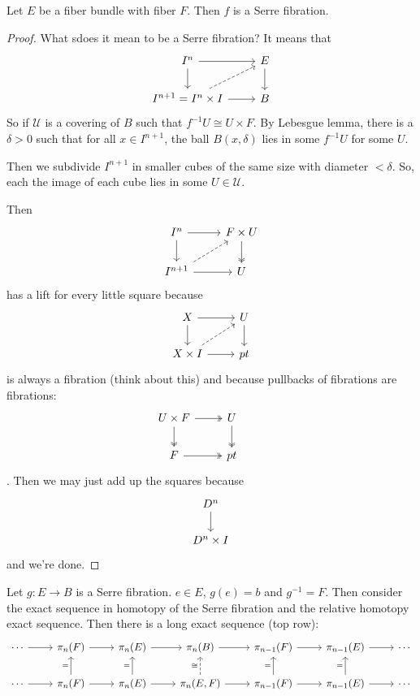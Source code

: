 \documentclass{article}
\newcommand{\Uc}{\mathcal{U}}
\begin{document}
\begin{prop}
	Let $E$ be a fiber bundle with fiber $F$. Then $f$ is a Serre fibration.
\end{prop}
\begin{proof}
	What sdoes it mean to be a Serre fibration? It means that
	\[\begin{tikzcd}
		I^n\arrow[r]\arrow[d]&E\arrow[d]\\
		I^{n+1}=I^n\times I\arrow[r]\arrow[ur,dashed]&B
	\end{tikzcd}\]
	So if $\Uc$ is a covering of $B$ such that $f^{-1}U\cong U\times F$. By Lebesgue lemma, there is a $\delta>0$ such that for all $x\in I^{n+1}$, the ball $B(x,\delta)$ lies in some $f^{-1}U$ for some $U$.
	
	Then we subdivide $I^{n+1}$ in smaller cubes of the same size with diameter $<\delta$. So, each the image of each cube lies in some $U\in\Uc$.
	
	Then
	\[\begin{tikzcd}
		I^n\arrow[d]\arrow[r]&F\times U\arrow[d,two heads]\\
		I^{n+1}\arrow[r]\arrow[ur,dashed]&U
	\end{tikzcd}\]
	has a lift for every little square because
	\[\begin{tikzcd}
		X\arrow[r]\arrow[d]&U\arrow[d]\\
		X\times I\arrow[r]\arrow[ur,dashed]&pt
	\end{tikzcd}\]
	is always a fibration {\color{orange}(think about this)} and because pullbacks of fibrations are fibrations:
	\[\begin{tikzcd}
		U\times F\arrow[r,two heads]\arrow[d,two heads]&U\arrow[d,two heads]&\\
		F\arrow[r,two heads]&pt
	\end{tikzcd}\].
	Then we may just add up the squares because
	\[\begin{tikzcd}
		D^n\arrow[d]\\
		D^n\times I
	\end{tikzcd}\]
	and we're done.
\end{proof}
\begin{prop}\label{thm:serre-fibrations-lectures}
	Let $g:E\to B$ is a Serre fibration. $e\in E$, $g(e)= b$ and $g^{-1}=F$. Then consider the exact sequence in homotopy of the Serre fibration and the relative homotopy exact sequence. Then there is a long exact sequence (top row):
	\[\begin{tikzcd}
		\cdots\arrow[r]&\pi_n(F)\arrow[r]&\pi_n(E)\arrow[r]&\pi_n(B)\arrow[r]&\pi_{n-1}(F)\arrow[r]&\pi_{n-1}(E)\arrow[r]&\cdots\\
		\cdots\arrow[r]&\pi_n(F)\arrow[r]\arrow[u,"="]&\pi_n(E)\arrow[r]\arrow[u,"="]&\pi_n(E,F)\arrow[r]\arrow[u,"\cong",dashed]&\pi_{n-1}(F)\arrow[r]\arrow[u,"="]&\pi_{n-1}(E)\arrow[r]\arrow[u,"="]&\cdots
	\end{tikzcd}\]
\end{prop}
\end{document}

